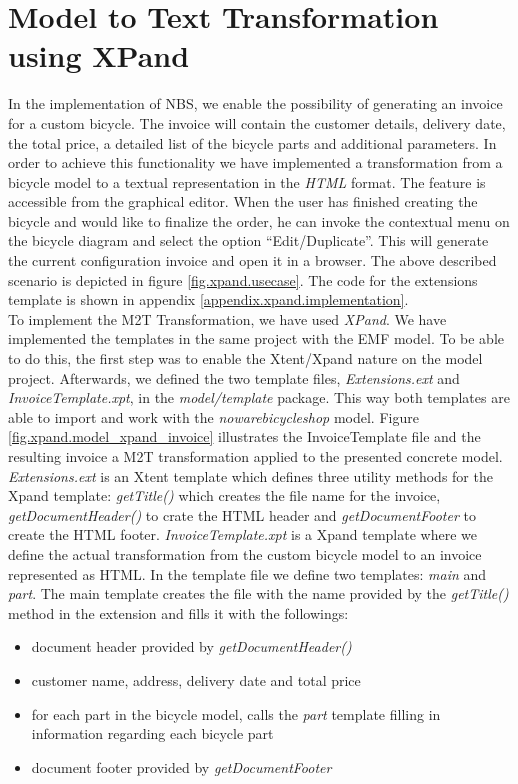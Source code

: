 \section{Model to Text Transformation using XPand}
\label{sec.m2t}
\noindent In the implementation of NBS, we enable the possibility of
generating an invoice for a custom bicycle. The invoice will contain the
customer details, delivery date, the total price, a detailed
list of the bicycle parts and additional parameters. In
order to achieve this functionality we have implemented a transformation from a
bicycle model to a textual representation in the \emph{HTML} format. The
feature is accessible from the graphical editor. When the user has finished
creating the bicycle and would like to finalize the order, he can invoke the
contextual menu on the bicycle diagram and select the option ``Edit/Duplicate''. This will generate the current configuration invoice and open it in a browser. The above described scenario is depicted in figure \ref{fig.xpand.usecase}. The
code for the extensions template is shown in appendix
\ref{appendix.xpand.implementation}.\\

\noindent To implement the M2T Transformation, we have used \emph{XPand}. We
have implemented the templates in the same project with the EMF model. To be able to
do this, the first step was to enable the Xtent/Xpand nature on the model
project. Afterwards, we defined the two template files, \emph{Extensions.ext}
and \emph{InvoiceTemplate.xpt}, in the \emph{model/template} package. This way
both templates are able to import and work with the \emph{nowarebicycleshop}
model. Figure \ref{fig.xpand.model_xpand_invoice} illustrates the
InvoiceTemplate file and the resulting invoice a M2T transformation applied to
the presented concrete model.\\

\noindent \emph{Extensions.ext} is an Xtent template which defines three utility
methods for the Xpand template: \emph{getTitle()} which creates the file name
for the invoice, \emph{getDocumentHeader()} to crate the HTML header and
\emph{getDocumentFooter} to create the HTML footer. \emph{InvoiceTemplate.xpt}
is a Xpand template where we define the actual transformation from the custom
bicycle model to an invoice represented as HTML. In the template file we define
two templates: \emph{main} and \emph{part}. The main template creates the file
with the name provided by the \emph{getTitle()} method in the extension and
fills it with the followings:
\begin{itemize}
  \item document header provided by \emph{getDocumentHeader()}
  \item customer name, address, delivery date and total price
  \item for each part in the bicycle model, calls the \emph{part} template
  filling in information regarding each bicycle part
  \item document footer provided by \emph{getDocumentFooter}
\end{itemize}\\

